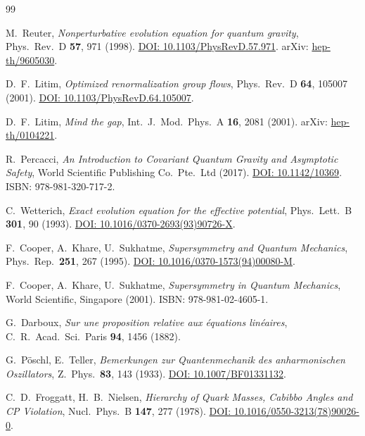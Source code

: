 \documentclass[11pt,a4paper]{article}
\theoremstyle{definition}
\begin{document}
\begin{thebibliography}{99}

M.~Reuter,
\textit{Nonperturbative evolution equation for quantum gravity},
Phys.\ Rev.\ D \textbf{57}, 971 (1998).
\href{https://doi.org/10.1103/PhysRevD.57.971}{DOI: 10.1103/PhysRevD.57.971}.
arXiv: \href{https://arxiv.org/abs/hep-th/9605030}{hep-th/9605030}.

D.~F.~Litim,
\textit{Optimized renormalization group flows},
Phys.\ Rev.\ D \textbf{64}, 105007 (2001).
\href{https://doi.org/10.1103/PhysRevD.64.105007}{DOI: 10.1103/PhysRevD.64.105007}.

D.~F.~Litim,
\textit{Mind the gap},
Int.\ J.\ Mod.\ Phys.\ A \textbf{16}, 2081 (2001).
arXiv: \href{https://arxiv.org/abs/hep-th/0104221}{hep-th/0104221}.

R.~Percacci,
\textit{An Introduction to Covariant Quantum Gravity and Asymptotic Safety},
World Scientific Publishing Co.\ Pte.\ Ltd (2017).
\href{https://doi.org/10.1142/10369}{DOI: 10.1142/10369}.
ISBN: 978-981-320-717-2.

C.~Wetterich,
\textit{Exact evolution equation for the effective potential},
Phys.\ Lett.\ B \textbf{301}, 90 (1993).
\href{https://doi.org/10.1016/0370-2693(93)90726-X}{DOI: 10.1016/0370-2693(93)90726-X}.

F.~Cooper, A.~Khare, U.~Sukhatme,
\textit{Supersymmetry and Quantum Mechanics},
Phys.\ Rep.\ \textbf{251}, 267 (1995).
\href{https://doi.org/10.1016/0370-1573(94)00080-M}{DOI: 10.1016/0370-1573(94)00080-M}.

F.~Cooper, A.~Khare, U.~Sukhatme,
\textit{Supersymmetry in Quantum Mechanics},
World Scientific, Singapore (2001).
ISBN: 978-981-02-4605-1.

G.~Darboux,
\textit{Sur une proposition relative aux équations linéaires},
C.\ R.\ Acad.\ Sci.\ Paris \textbf{94}, 1456 (1882).

G.~P\"oschl, E.~Teller,
\textit{Bemerkungen zur Quantenmechanik des anharmonischen Oszillators},
Z.\ Phys.\ \textbf{83}, 143 (1933).
\href{https://doi.org/10.1007/BF01331132}{DOI: 10.1007/BF01331132}.

C.~D.~Froggatt, H.~B.~Nielsen,
\textit{Hierarchy of Quark Masses, Cabibbo Angles and CP Violation},
Nucl.\ Phys.\ B \textbf{147}, 277 (1978).
\href{https://doi.org/10.1016/0550-3213(78)90026-0}{DOI: 10.1016/0550-3213(78)90026-0}.


\end{thebibliography}
\end{document}
